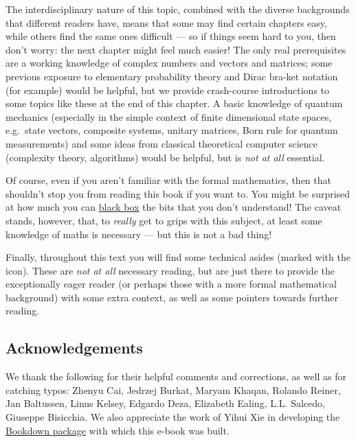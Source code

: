 \documentclass[fleqn]{article}
\begin{document}
The interdisciplinary nature of this topic, combined with the diverse backgrounds that different readers have, means that some may find certain chapters easy, while others find the same ones difficult --- so if things seem hard to you, then don't worry: the next chapter might feel much easier!
The only real prerequisites are a working knowledge of complex numbers and vectors and matrices; some previous exposure to elementary probability theory and Dirac bra-ket notation (for example) would be helpful, but we provide crash-course introductions to some topics like these at the end of this chapter.
A basic knowledge of quantum mechanics (especially in the simple context of finite dimensional state spaces, e.g.~state vectors, composite systems, unitary matrices, Born rule for quantum measurements) and some ideas from classical theoretical computer science (complexity theory, algorithms) would be helpful, but is \emph{not at all} essential.

Of course, even if you aren't familiar with the formal mathematics, then that shouldn't stop you from reading this book if you want to.
You might be surprised at how much you can \href{https://en.wikipedia.org/wiki/Black_box}{black box} the bits that you don't understand!
The caveat stands, however, that, to \emph{really} get to grips with this subject, at least some knowledge of maths is necessary --- but this is not a bad thing!

Finally, throughout this text you will find some technical asides (marked with the icon).
These are \emph{not at all} necessary reading, but are just there to provide the exceptionally eager reader (or perhaps those with a more formal mathematical background) with some extra context, as well as some pointers towards further reading.

\hypertarget{acknowledgements}{%
\subsection*{Acknowledgements}\label{acknowledgements}}

We thank the following for their helpful comments and corrections, as well as for catching typos: Zhenyu Cai, Jedrzej Burkat, Maryam Khaqan, Rolando Reiner, Jan Baltussen, Linus Kelsey, Edgardo Deza, Elizabeth Ealing, L.L. Salcedo, Giuseppe Bisicchia.
We also appreciate the work of Yihui Xie in developing the \href{https://bookdown.org/yihui/bookdown/}{Bookdown package} with which this e-book was built.
\end{document}
